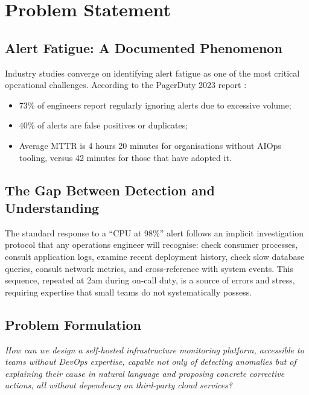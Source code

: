 \section{Problem Statement}

\subsection{Alert Fatigue: A Documented Phenomenon}

Industry studies converge on identifying alert fatigue as one of the most
critical operational challenges. According to the PagerDuty 2023 report
\cite{pagerduty2023}:

\begin{itemize}
  \item 73\% of engineers report regularly ignoring alerts due to excessive volume;
  \item 40\% of alerts are false positives or duplicates;
  \item Average MTTR is 4 hours 20 minutes for organisations without AIOps
    tooling, versus 42 minutes for those that have adopted it.
\end{itemize}

\subsection{The Gap Between Detection and Understanding}

The standard response to a ``CPU at 98\%'' alert follows an implicit
investigation protocol that any operations engineer will recognise:
check consumer processes, consult application logs, examine recent deployment
history, check slow database queries, consult network metrics, and cross-reference
with system events. This sequence, repeated at 2am during on-call duty, is a
source of errors and stress, requiring expertise that small teams do not
systematically possess.

\subsection{Problem Formulation}

\begin{infobox}
\textit{How can we design a self-hosted infrastructure monitoring platform,
accessible to teams without DevOps expertise, capable not only of detecting
anomalies but of explaining their cause in natural language and proposing
concrete corrective actions, all without dependency on third-party cloud services?}
\end{infobox}

